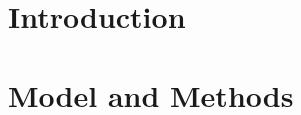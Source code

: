 \documentclass[aps,pre,twocolumn,groupedaddress]{revtex4-1}
\begin{document}
\section{Introduction}
\section{Model and Methods}



\end{document}
